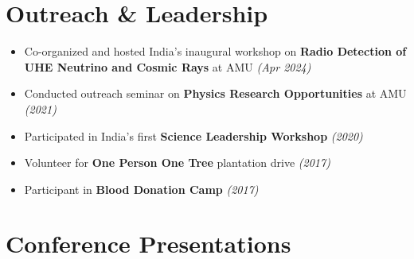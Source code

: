 \documentclass[10pt]{report}
\begin{document}
\section*{Outreach \& Leadership}
\begin{itemize}
    \item Co-organized and hosted India's inaugural workshop on \textbf{Radio Detection of UHE Neutrino and Cosmic Rays} at AMU \textit{(Apr 2024)}
    \item Conducted outreach seminar on \textbf{Physics Research Opportunities} at AMU \textit{(2021)}
    \item Participated in India's first \textbf{Science Leadership Workshop} \textit{(2020)}
    \item Volunteer for \textbf{One Person One Tree} plantation drive \textit{(2017)}
    \item Participant in \textbf{Blood Donation Camp} \textit{(2017)}
\end{itemize}

\section*{Conference Presentations}
\end{document}
